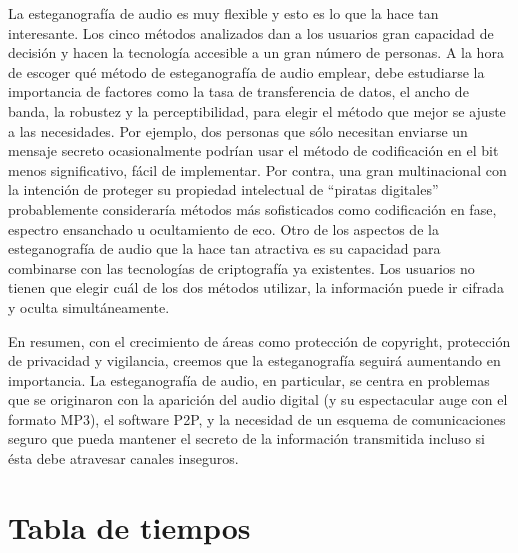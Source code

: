 \documentclass[12pt]{article}
\begin{document}
La esteganografía de audio es muy flexible y esto es lo que la hace tan interesante. Los cinco métodos analizados dan a los usuarios gran capacidad de decisión y hacen la tecnología accesible a un gran número de personas. A la hora de escoger qué método de esteganografía de audio emplear, debe estudiarse la importancia de factores como la tasa de transferencia de datos, el ancho de banda, la robustez y la perceptibilidad, para elegir el método que mejor se ajuste a las necesidades. Por ejemplo, dos personas que sólo necesitan enviarse un mensaje secreto ocasionalmente podrían usar el método de codificación en el bit menos significativo, fácil de implementar. Por contra, una gran multinacional con la intención de proteger su propiedad intelectual de ``piratas digitales'' probablemente consideraría métodos más sofisticados como codificación en fase, espectro ensanchado u ocultamiento de eco. Otro de los aspectos de la esteganografía de audio que la hace tan atractiva es su capacidad para combinarse con las tecnologías de criptografía ya existentes. Los usuarios no tienen que elegir cuál de los dos métodos utilizar, la información puede ir cifrada y oculta simultáneamente.

En resumen, con el crecimiento de áreas como protección de copyright, protección de privacidad y vigilancia, creemos que la esteganografía seguirá aumentando en importancia. La esteganografía de audio, en particular, se centra en problemas que se originaron con la aparición del audio digital (y su espectacular auge con el formato MP3), el software P2P, y la necesidad de un esquema de comunicaciones seguro que pueda mantener el secreto de la información transmitida incluso si ésta debe atravesar canales inseguros.

\clearpage
\section{Tabla de tiempos}
\end{document}
